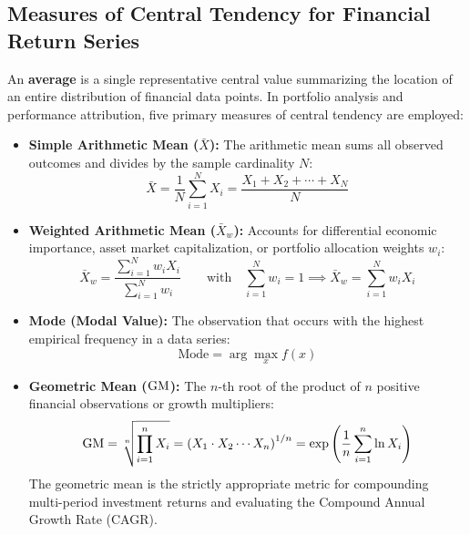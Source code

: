 \subsection{Measures of Central Tendency for Financial Return Series}
An \textbf{average} is a single representative central value summarizing the location of an entire distribution of financial data points. In portfolio analysis and performance attribution, five primary measures of central tendency are employed:

\begin{formulabox}
\begin{itemize}[leftmargin=*, noitemsep]
    \item \textbf{Simple Arithmetic Mean ($\bar{X}$):}
    The arithmetic mean sums all observed outcomes and divides by the sample cardinality $N$:
    \begin{equation}
        \bar{X} = \frac{1}{N}\sum_{i=1}^{N} X_i = \frac{X_1 + X_2 + \cdots + X_N}{N}
    \end{equation}

    \item \textbf{Weighted Arithmetic Mean ($\bar{X}_w$):}
    Accounts for differential economic importance, asset market capitalization, or portfolio allocation weights $w_i$:
    \begin{equation}
        \bar{X}_w = \frac{\sum_{i=1}^{N} w_i X_i}{\sum_{i=1}^{N} w_i} \qquad \text{with} \quad \sum_{i=1}^{N} w_i = 1 \implies \bar{X}_w = \sum_{i=1}^{N} w_i X_i
    \end{equation}

    \item \textbf{Mode (Modal Value):}
    The observation that occurs with the highest empirical frequency in a data series:
    \begin{equation}
        \text{Mode} = \arg\max_{x} f(x)
    \end{equation}

    \item \textbf{Geometric Mean ($\operatorname{GM}$):}
    The $n$-th root of the product of $n$ positive financial observations or growth multipliers:
    \begin{equation}
        \operatorname{GM} = \sqrt[n]{\prod_{i=1}^{n} X_i} = \left(X_1 \cdot X_2 \cdots X_n\right)^{1/n} = \exp\left(\frac{1}{n}\sum_{i=1}^{n} \ln X_i\right)
    \end{equation}
    The geometric mean is the strictly appropriate metric for compounding multi-period investment returns and evaluating the Compound Annual Growth Rate (CAGR).


\end{itemize}
\end{formulabox}
